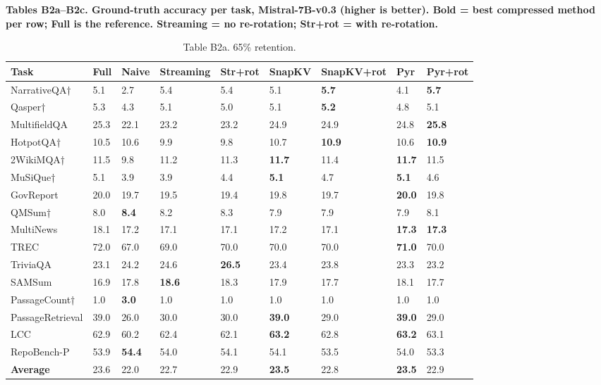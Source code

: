 \documentclass[10pt,letterpaper]{article}
\begin{document}
\textbf{Tables B2a--B2c. Ground-truth accuracy per task, Mistral-7B-v0.3
(higher is better). Bold = best compressed method per row; Full is the
reference. Streaming = no re-rotation; Str+rot = with re-rotation.}

\begin{table}[H]
\centering
\small
\caption*{Table B2a. 65\% retention.}
\begin{tabular}{@{}lllllllll@{}}
\toprule
Task & Full & Naive & Streaming & Str+rot & SnapKV & SnapKV+rot & Pyr &
Pyr+rot\\
\midrule
    NarrativeQA† & 5.1 & 2.7 & 5.4 & 5.4 & 5.1 & \textbf{5.7} & 4.1 & \textbf{5.7}\\
    Qasper† & 5.3 & 4.3 & 5.1 & 5.0 & 5.1 & \textbf{5.2} & 4.8 & 5.1\\
    MultifieldQA & 25.3 & 22.1 & 23.2 & 23.2 & 24.9 & 24.9 & 24.8 & \textbf{25.8}\\
    HotpotQA† & 10.5 & 10.6 & 9.9 & 9.8 & 10.7 & \textbf{10.9} & 10.6 & \textbf{10.9}\\
    2WikiMQA† & 11.5 & 9.8 & 11.2 & 11.3 & \textbf{11.7} & 11.4 & \textbf{11.7} & 11.5\\
    MuSiQue† & 5.1 & 3.9 & 3.9 & 4.4 & \textbf{5.1} & 4.7 & \textbf{5.1} & 4.6\\
    GovReport & 20.0 & 19.7 & 19.5 & 19.4 & 19.8 & 19.7 & \textbf{20.0} & 19.8\\
    QMSum† & 8.0 & \textbf{8.4} & 8.2 & 8.3 & 7.9 & 7.9 & 7.9 & 8.1\\
    MultiNews & 18.1 & 17.2 & 17.1 & 17.1 & 17.2 & 17.1 & \textbf{17.3} & \textbf{17.3}\\
    TREC & 72.0 & 67.0 & 69.0 & 70.0 & 70.0 & 70.0 & \textbf{71.0} & 70.0\\
    TriviaQA & 23.1 & 24.2 & 24.6 & \textbf{26.5} & 23.4 & 23.8 & 23.3 & 23.2\\
    SAMSum & 16.9 & 17.8 & \textbf{18.6} & 18.3 & 17.9 & 17.7 & 18.1 & 17.7\\
    PassageCount† & 1.0 & \textbf{3.0} & 1.0 & 1.0 & 1.0 & 1.0 & 1.0 & 1.0\\
    PassageRetrieval & 39.0 & 26.0 & 30.0 & 30.0 & \textbf{39.0} & 29.0 & \textbf{39.0} & 29.0\\
    LCC & 62.9 & 60.2 & 62.4 & 62.1 & \textbf{63.2} & 62.8 & \textbf{63.2} & 63.1\\
    RepoBench-P & 53.9 & \textbf{54.4} & 54.0 & 54.1 & 54.1 & 53.5 & 54.0 & 53.3\\
    \textbf{Average} & 23.6 & 22.0 & 22.7 & 22.9 & \textbf{23.5} & 22.8 & \textbf{23.5} & 22.9\\
\bottomrule
\end{tabular}
\end{table}
\end{document}
